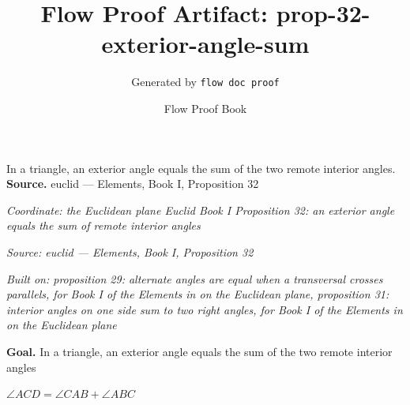 \documentclass[11pt]{article}
\title{Flow Proof Artifact: prop-32-exterior-angle-sum}
\author{Generated by \texttt{flow doc proof}}
\date{Flow Proof Book}
\theoremstyle{definition}
\begin{document}
\maketitle
In a triangle, an exterior angle equals the sum of the two remote interior angles.\\[0.5em]
\textbf{Source.} euclid — Elements, Book I, Proposition 32\\[0.5em]
\bigskip
{}\par
\smallskip\noindent\textit{Coordinate: the Euclidean plane \cdot Euclid Book I \cdot Proposition 32: an exterior angle equals the sum of remote interior angles}\par
\smallskip\noindent\textit{Source: euclid — Elements, Book I, Proposition 32}\par
\smallskip\noindent\textit{Built on: proposition 29: alternate angles are equal when a transversal crosses parallels, for Book I of the Elements in on the Euclidean plane, proposition 31: interior angles on one side sum to two right angles, for Book I of the Elements in on the Euclidean plane}\par
\medskip
\noindent\textbf{Goal.} In a triangle, an exterior angle equals the sum of the two remote interior angles\par
\noindent$\displaystyle \angle ACD = \angle CAB + \angle ABC$\par
\medskip
\noindent
\end{document}
